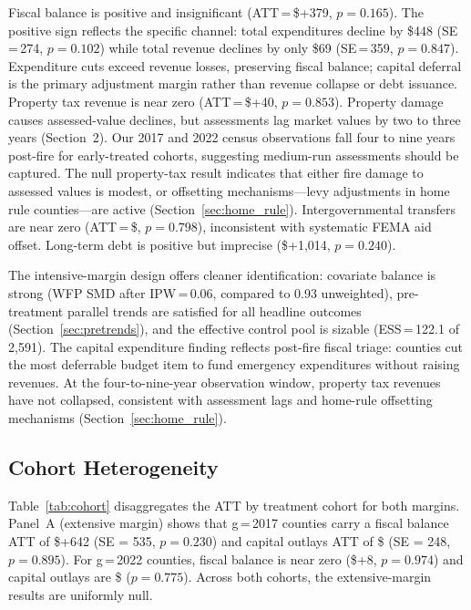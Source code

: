 \documentclass[12pt]{article}
\begin{document}
Fiscal balance is positive and insignificant (ATT\,=\,\$+379, $p = 0.165$). The
positive sign reflects the specific channel: total expenditures decline by \$448
(SE\,=\,274, $p = 0.102$) while total revenue declines by only \$69
(SE\,=\,359, $p = 0.847$). Expenditure cuts exceed revenue losses, preserving fiscal balance; capital deferral
is the primary adjustment margin rather than revenue collapse or debt issuance. Property tax revenue is near zero (ATT\,=\,\$+40, $p = 0.853$). Property damage
causes assessed-value declines, but assessments lag market values by two to three
years (Section~2). Our 2017 and 2022 census observations fall four to nine years
post-fire for early-treated cohorts, suggesting medium-run assessments should be
captured. The null property-tax result indicates that either fire damage to assessed
values is modest, or offsetting mechanisms---levy adjustments in home rule
counties---are active (Section~\ref{sec:home_rule}). Intergovernmental transfers are
near zero (ATT\,=\,\$, $p = 0.798$), inconsistent with systematic FEMA aid
offset. Long-term debt is positive but
imprecise (\$+1,014, $p = 0.240$).

The intensive-margin design offers cleaner identification: covariate balance is strong
(WFP SMD after IPW\,=\,0.06, compared to 0.93 unweighted), pre-treatment parallel
trends are satisfied for all headline outcomes (Section~\ref{sec:pretrends}), and
the effective control pool is sizable (ESS\,=\,122.1 of 2,591). The capital
expenditure finding reflects post-fire fiscal triage: counties cut the most
deferrable budget item to fund emergency expenditures without raising revenues. At
the four-to-nine-year observation window, property tax revenues have not collapsed,
consistent with assessment lags and home-rule offsetting mechanisms (Section~\ref{sec:home_rule}).

\subsection{Cohort Heterogeneity}
\label{sec:cohort}

Table~\ref{tab:cohort} disaggregates the ATT by treatment cohort for both margins.
Panel~A (extensive margin) shows that g\,=\,2017 counties carry a fiscal balance ATT
of \$+642 (SE = 535, $p = 0.230$) and capital outlays ATT of \$ (SE = 248,
$p = 0.895$). For g\,=\,2022 counties, fiscal balance is near zero (\$+8,
$p = 0.974$) and capital outlays are \$ ($p = 0.775$). Across both cohorts,
the extensive-margin results are uniformly null.
\end{document}
